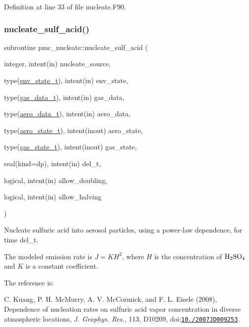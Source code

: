 Definition at line 33 of file nucleate.\+F90.

\mbox{\label{namespacepmc__nucleate_a417a8f6c4fbc4f588ac915a173b2fda2}} 
\subsubsection{\texorpdfstring{nucleate\+\_\+sulf\+\_\+acid()}{nucleate\_sulf\_acid()}}
{\footnotesize\ttfamily subroutine pmc\+\_\+nucleate\+::nucleate\+\_\+sulf\+\_\+acid (\begin{DoxyParamCaption}\item[{integer, intent(in)}]{nucleate\+\_\+source,  }\item[{type(\mbox{\hyperlink{structpmc__env__state_1_1env__state__t}{env\+\_\+state\+\_\+t}}), intent(in)}]{env\+\_\+state,  }\item[{type(\mbox{\hyperlink{structpmc__gas__data_1_1gas__data__t}{gas\+\_\+data\+\_\+t}}), intent(in)}]{gas\+\_\+data,  }\item[{type(\mbox{\hyperlink{structpmc__aero__data_1_1aero__data__t}{aero\+\_\+data\+\_\+t}}), intent(in)}]{aero\+\_\+data,  }\item[{type(\mbox{\hyperlink{structpmc__aero__state_1_1aero__state__t}{aero\+\_\+state\+\_\+t}}), intent(inout)}]{aero\+\_\+state,  }\item[{type(\mbox{\hyperlink{structpmc__gas__state_1_1gas__state__t}{gas\+\_\+state\+\_\+t}}), intent(inout)}]{gas\+\_\+state,  }\item[{real(kind=dp), intent(in)}]{del\+\_\+t,  }\item[{logical, intent(in)}]{allow\+\_\+doubling,  }\item[{logical, intent(in)}]{allow\+\_\+halving }\end{DoxyParamCaption})}



Nucleate sulfuric acid into aerosol particles, using a power-\/law dependence, for time {\ttfamily del\+\_\+t}. 

The modeled emission rate is $ J = K H^2 $, where $H$ is the concentration of $ \rm H_2SO_4 $ and $K$ is a constant coefficient.

The reference is\+:

C. Kuang, P. H. Mc\+Murry, A. V. Mc\+Cormick, and F. L. Eisele (2008), Dependence of nucleation rates on sulfuric acid vapor concentration in diverse atmospheric locations, {\itshape J. Geophys. Res.}, 113, D10209, doi\+:\href{http://dx.doi.org/10.1029/2007JD009253}{\tt 10./2007\+J\+D009253}.


